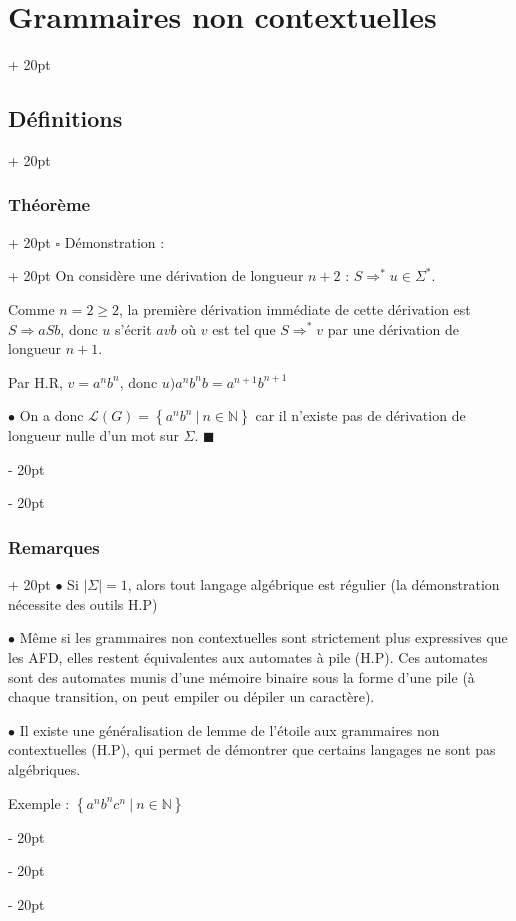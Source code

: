 \documentclass[a4paper, 12pt, twoside]{article}
\newcommand{\N}{\mathbb{N}} %
\newcommand{\set}[1]{\left\{ #1 \right\}}
\newcommand{\abs}[1]{\left\lvert #1 \right\rvert}
\renewcommand{\ge}{\geqslant}
\newcommand{\ind}[1][20pt]{\advance\leftskip + #1}
\newcommand{\deind}[1][20pt]{\advance\leftskip - #1}
\newenvironment{indt}[2][20pt]{#2 \par \ind[#1]}{\par \deind} %
\newenvironment{proof}[1][{Démonstration :}]{\begin{indt}{$\square$ #1}}{$\blacksquare$ \end{indt}}
\begin{document}
\begin{indt}{\section{Grammaires non contextuelles}}
\begin{indt}{\subsection{Définitions}}
\begin{indt}{\subsubsection{Théorème}}
\begin{proof}
                    On considère une dérivation de longueur $n + 2$ : $S \Rightarrow^* u \in \Sigma^*$.

                    Comme $n = 2 \ge 2$, la première dérivation immédiate de cette dérivation est $S \Rightarrow aSb$, donc $u$ s'écrit $avb$ où $v$ est tel que $S \Rightarrow^* v$ par une dérivation de longueur $n + 1$.

                    Par H.R, $v = a^n b^n$, donc $u ) a^n b^n b = a^{n + 1} b^{n + 1}$

                    \vspace{12pt}
                    
                    $\bullet$  On a donc $\mathcal L(G) = \set{a^n b^n\ |\ n \in \N}$ car il n'existe pas de dérivation de longueur nulle d'un mot sur $\Sigma$.
                \end{proof}
            \end{indt}

            \vspace{12pt}
            
            \begin{indt}{\subsubsection{Remarques}}
                $\bullet$ Si $\abs \Sigma = 1$, alors tout langage algébrique est régulier (la démonstration nécessite des outils H.P)

                \vspace{6pt}
                
                $\bullet$ Même si les grammaires non contextuelles sont strictement plus expressives que les AFD, elles restent équivalentes aux automates à pile (H.P).
                Ces automates sont des automates munis d'une mémoire binaire sous la forme d'une pile (à chaque transition, on peut empiler ou dépiler un caractère).

                \vspace{6pt}
                
                $\bullet$ Il existe une généralisation de lemme de l'étoile aux grammaires non contextuelles (H.P), qui permet de démontrer que certains langages ne sont pas algébriques.

                Exemple : $\set{a^n b^n c^n\ |\ n \in \N}$
            \end{indt}
        \end{indt}
    \end{indt}
    
\end{document}
